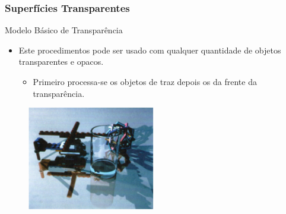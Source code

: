 \documentclass{beamer}
\begin{document}
\begin{frame}
\frametitle{Superfícies Transparentes}

	\begin{block}{Modelo Básico de Transparência}
		\begin{itemize}
			\item Este procedimentos pode ser usado com qualquer quantidade de objetos transparentes e opacos.
			\begin{itemize}
				\item Primeiro processa-se os objetos de traz depois os da frente da transparência.
			\end{itemize}
		\end{itemize}
	\end{block}

	\begin{figure}[!h]
		\begin{center}
		\includegraphics[width=0.5\textwidth]{Figures/TraPic}
		\end{center}
	\end{figure}	
\end{frame}

\end{document}
